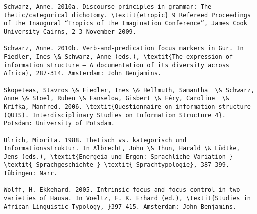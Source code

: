 \documentclass[output=paper]{langsci/langscibook}
\begin{document}
\begin{verbatim}
Schwarz, Anne. 2010a. Discourse principles in grammar: The thetic/categorical dichotomy. \textit{etropic} 9 Refereed Proceedings of the Inaugural “Tropics of the Imagination Conference”, James Cook University Cairns, 2-3 November 2009.

Schwarz, Anne. 2010b. Verb-and-predication focus markers in Gur. In Fiedler, Ines \& Schwarz, Anne (eds.), \textit{The expression of information structure – A documentation of its diversity across Africa}, 287-314. Amsterdam: John Benjamins.

Skopeteas, Stavros \& Fiedler, Ines \& Hellmuth, Samantha  \& Schwarz, Anne \& Stoel, Ruben \& Fanselow, Gisbert \& Féry, Caroline  \& Krifka, Manfred. 2006. \textit{Questionnaire on information structure (QUIS). Interdisciplinary Studies on Information Structure 4}. Potsdam: University of Potsdam.

Ulrich, Miorita. 1988. Thetisch vs. kategorisch und Informationsstruktur. In Albrecht, John \& Thun, Harald \& Lüdtke, Jens (eds.), \textit{Energeia und Ergon: Sprachliche Variation }–\textit{ Sprachgeschichte }–\textit{ Sprachtypologie}, 387-399. Tübingen: Narr.

Wolff, H. Ekkehard. 2005. Intrinsic focus and focus control in two varieties of Hausa. In Voeltz, F. K. Erhard (ed.), \textit{Studies in African Linguistic Typology, }397-415. Amsterdam: John Benjamins.


\end{verbatim}
 

\printbibliography[heading=subbibliography,notkeyword=this]
\end{document}
